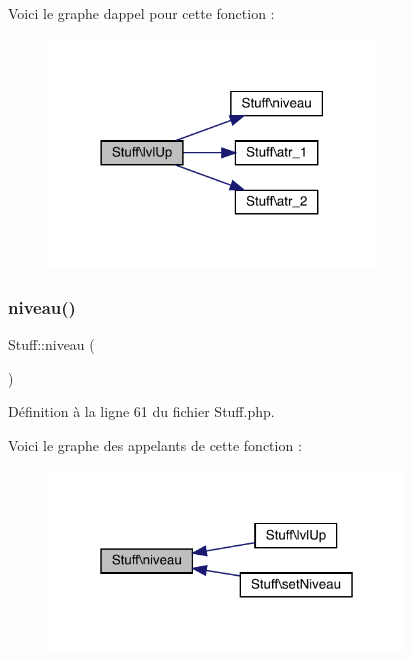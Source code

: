 Voici le graphe d\textquotesingle{}appel pour cette fonction \+:\nopagebreak
\begin{figure}[H]
\begin{center}
\leavevmode
\includegraphics[width=246pt]{class_stuff_a58df203bb30ef856eab931a8b363ee69_cgraph}
\end{center}
\end{figure}
\mbox{\label{class_stuff_a4d8664e6878c9661e0d0dcf46b1bd5d6}} 
\subsubsection{\texorpdfstring{niveau()}{niveau()}}
{\footnotesize\ttfamily Stuff\+::niveau (\begin{DoxyParamCaption}{ }\end{DoxyParamCaption})}



Définition à la ligne 61 du fichier Stuff.\+php.

Voici le graphe des appelants de cette fonction \+:\nopagebreak
\begin{figure}[H]
\begin{center}
\leavevmode
\includegraphics[width=268pt]{class_stuff_a4d8664e6878c9661e0d0dcf46b1bd5d6_icgraph}
\end{center}
\end{figure}
\mbox{\label{class_stuff_a38d4592ddc6ed1f09868ea5b7a82fdb9}} 
